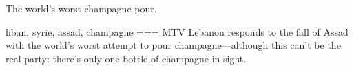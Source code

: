 The world’s worst champagne pour.

liban, syrie, assad, champagne
===
MTV Lebanon responds to the fall of Assad with the world’s worst attempt to pour champagne—although this can’t be the real party: there’s only one bottle of champagne in sight.

\nocite{2024g}